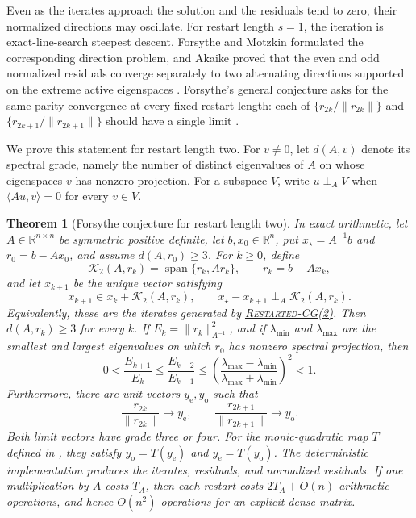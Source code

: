 \documentclass[11pt]{article}
\newtheorem{theorem}{Theorem}[section]
\begin{document}
Even as the iterates approach the solution and the residuals tend to zero,
their normalized directions may oscillate.
For restart length \(s=1\), the iteration is exact-line-search steepest
descent.  Forsythe and Motzkin formulated the corresponding direction
problem, and Akaike proved that the even and odd normalized residuals
converge separately to two alternating directions supported on the extreme
active eigenspaces
\cite{ForsytheMotzkin1951,Akaike1959}.  Forsythe's general conjecture asks
for the same parity convergence at every fixed restart length: each of
\(\{r_{2k}/\lVert r_{2k}\rVert\}\) and
\(\{r_{2k+1}/\lVert r_{2k+1}\rVert\}\) should have a single limit
\cite{Forsythe1968,FaberLiesenTichy2023}.

We prove this statement for restart length two.  For \(v\neq0\), let
\(d(A,v)\) denote its spectral grade, namely the number of distinct
eigenvalues of \(A\) on whose eigenspaces \(v\) has nonzero projection.
For a subspace \(V\), write \(u\perp_A V\) when
\(\langle Au,v\rangle=0\) for every \(v\in V\).

\begin{theorem}[Forsythe conjecture for restart length two]
\label{thm:forsythe-s2}
In exact arithmetic, let \(A\in\mathbb R^{n\times n}\) be symmetric
positive definite, let \(b,x_0\in\mathbb R^n\), put
\(x_\star=A^{-1}b\) and \(r_0=b-Ax_0\), and assume
\(d(A,r_0)\geq3\).  For \(k\geq0\), define
\[
 \mathcal K_2(A,r_k)=\operatorname{span}\{r_k,Ar_k\},\qquad
 r_k=b-Ax_k,
\]
and let \(x_{k+1}\) be the unique vector satisfying
\[
 x_{k+1}\in x_k+\mathcal K_2(A,r_k),\qquad
 x_\star-x_{k+1}\perp_A\mathcal K_2(A,r_k).
\]
Equivalently, these are the iterates generated by
\hyperref[alg:restarted-cg2]{\textsc{Restarted-CG(2)}}.  Then
\(d(A,r_k)\geq3\) for every \(k\).  If
\(E_k=\lVert r_k\rVert_{A^{-1}}^2\), and if
\(\lambda_{\min}\) and \(\lambda_{\max}\) are the smallest and largest
eigenvalues on which \(r_0\) has nonzero spectral projection, then
\[
 0<\frac{E_{k+1}}{E_k}\leq\frac{E_{k+2}}{E_{k+1}}
 \leq
 \left(\frac{\lambda_{\max}-\lambda_{\min}}
 {\lambda_{\max}+\lambda_{\min}}\right)^2<1.
\]
Furthermore, there are unit vectors \(y_{\mathrm e},y_{\mathrm o}\) such
that
\[
 \frac{r_{2k}}{\lVert r_{2k}\rVert}\longrightarrow y_{\mathrm e},
 \qquad
 \frac{r_{2k+1}}{\lVert r_{2k+1}\rVert}\longrightarrow y_{\mathrm o}.
\]
Both limit vectors have grade three or four.  For the monic-quadratic map
\(T\) defined in , they satisfy
\(y_{\mathrm o}=T(y_{\mathrm e})\) and
\(y_{\mathrm e}=T(y_{\mathrm o})\).
The deterministic implementation produces the iterates, residuals, and
normalized residuals.  If one multiplication by \(A\) costs \(T_A\), then
each restart costs \(2T_A+O(n)\) arithmetic operations, and hence
\(O(n^2)\) operations for an explicit dense matrix.
\end{theorem}
\end{document}
